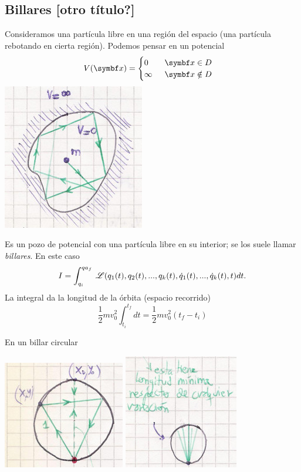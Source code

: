 \documentclass[10pt,oneside]{CBFT_book}
\begin{document}
\subsection{Billares [otro título?]}

Consideramos una partícula libre en una región del espacio (una partícula rebotando en cierta región). Podemos pensar en un
potencial 
\[
	V(\vb{x}) = \begin{cases}
	0\phantom{\infty} \quad \vb{x} \in D \\
	\infty\phantom{0} \quad \vb{x} \notin D
	\end{cases}
\]
\includegraphics[scale=0.3]{images/fig_mc_billar_1.jpg}

Es un pozo de potencial con una partícula libre en su interior; se los suele llamar {\it billares}. En este caso
\[
	I = \int_{q_i}^{qa_f} \: \mathscr{L}( q_1(t), q_2(t), ..., q_k(t),\dot{q}_1(t), ..., \dot{q}_k(t), t ) dt.
\]
La integral da la longitud de la órbita (espacio recorrido)
\[
	\frac 1 2 m v_0^2 \int_{t_i}^{t_f} dt = \frac 1 2 m v_0^2 (t_f - t_i)
\]

En un billar circular 

\includegraphics[scale=0.3]{images/fig_mc_billar_2.jpg}
\includegraphics[scale=0.3]{images/fig_mc_billar_2b.jpg}
\end{document}
